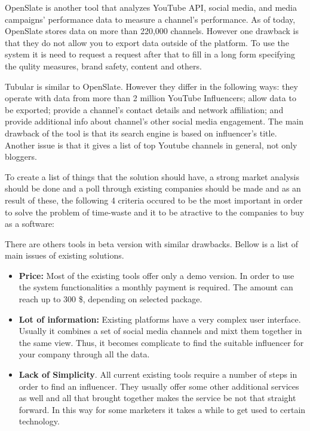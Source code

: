 OpenSlate is another tool that analyzes YouTube API, social media, and media campaigns’ performance data to measure a channel’s performance. As of today, OpenSlate stores data on more than 220,000 channels. However one drawback is that they do not allow you to export data outside of the platform. To use the system it is need to request a request after that to fill in a long form specifying the qulity measures, brand safety, content and others. 

Tubular is similar to OpenSlate. However they differ in the following ways: they operate with data from more than 2 million YouTube Influencers; allow data to be exported; provide a channel’s contact details and network affiliation; and provide additional info about channel’s other social media engagement. The main drawback of the tool is that its search engine is based on influencer's title. Another issue is that it gives a list of top Youtube channels in general, not only bloggers.

To create a list of things that the solution should have, a strong market analysis should be done and a poll through existing companies should be made and as an result of these, the following 4 criteria occured to be the most important in order to solve the problem of time-waste and it to be atractive to the companies to buy as a software:

There are others tools in beta version with similar drawbacks. Bellow is a list of main issues of existing solutions.

\begin{itemize}
\item \textbf{Price:} Most of the existing tools offer only a demo version. In order to use the system functionalities a monthly payment is required. The amount can reach up to 300 \$, depending on selected package.
\item \textbf{Lot of information:} Existing platforms have a very complex user interface. Usually it combines a set of social media channels and mixt them together in the same view. Thus, it becomes complicate to find the suitable influencer for your company through all the data.
\item \textbf{Lack of Simplicity}. All current existing tools require a number of steps in order to find an influencer. They usually offer some other additional services as well and all that brought together makes the service be not that straight forward. In this way for some marketers it takes a while to get used to certain technology.
\end{itemize}

